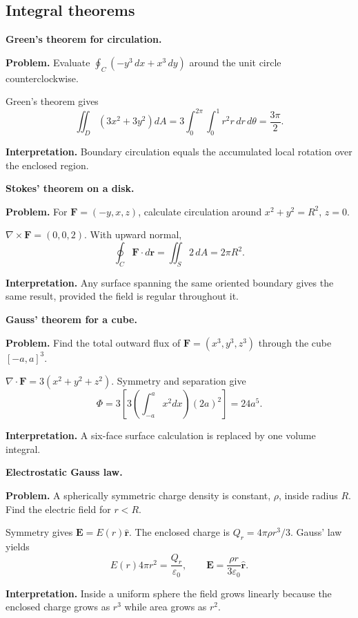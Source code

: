 \subsection{Integral theorems}

\begin{workedexample}
\textbf{Green's theorem for circulation.}\par
\textbf{Problem.} Evaluate $\oint_C(-y^3\,dx+x^3\,dy)$ around the unit circle counterclockwise.
\begin{solution}
Green's theorem gives
\[
\iint_D\left(3x^2+3y^2\right)dA
=3\int_0^{2\pi}\int_0^1r^2r\,dr\,d\theta=\frac{3\pi}{2}.
\]

\textbf{Interpretation.} Boundary circulation equals the accumulated local rotation over the enclosed region.
\end{solution}
\end{workedexample}

\begin{workedexample}
\textbf{Stokes' theorem on a disk.}\par
\textbf{Problem.} For $\mathbf F=(-y,x,z)$, calculate circulation around $x^2+y^2=R^2$, $z=0$.
\begin{solution}
$\nabla\times\mathbf F=(0,0,2)$. With upward normal,
\[
\oint_C\mathbf F\cdot d\mathbf r=\iint_S2\,dA=2\pi R^2.
\]

\textbf{Interpretation.} Any surface spanning the same oriented boundary gives the same result, provided the field is regular throughout it.
\end{solution}
\end{workedexample}

\begin{workedexample}
\textbf{Gauss' theorem for a cube.}\par
\textbf{Problem.} Find the total outward flux of $\mathbf F=(x^3,y^3,z^3)$ through the cube $[-a,a]^3$.
\begin{solution}
$\nabla\cdot\mathbf F=3(x^2+y^2+z^2)$. Symmetry and separation give
\[
\Phi=3\left[3\left(\int_{-a}^ax^2dx\right)(2a)^2\right]=24a^5.
\]

\textbf{Interpretation.} A six-face surface calculation is replaced by one volume integral.
\end{solution}
\end{workedexample}

\begin{workedexample}
\textbf{Electrostatic Gauss law.}\par
\textbf{Problem.} A spherically symmetric charge density is constant, $\rho$, inside radius $R$. Find the electric field for $r<R$.
\begin{solution}
Symmetry gives $\mathbf E=E(r)\hat{\mathbf r}$. The enclosed charge is $Q_r=4\pi\rho r^3/3$. Gauss' law yields
\[
E(r)4\pi r^2=\frac{Q_r}{\varepsilon_0},\qquad
\mathbf E=\frac{\rho r}{3\varepsilon_0}\hat{\mathbf r}.
\]

\textbf{Interpretation.} Inside a uniform sphere the field grows linearly because the enclosed charge grows as $r^3$ while area grows as $r^2$.
\end{solution}
\end{workedexample}

